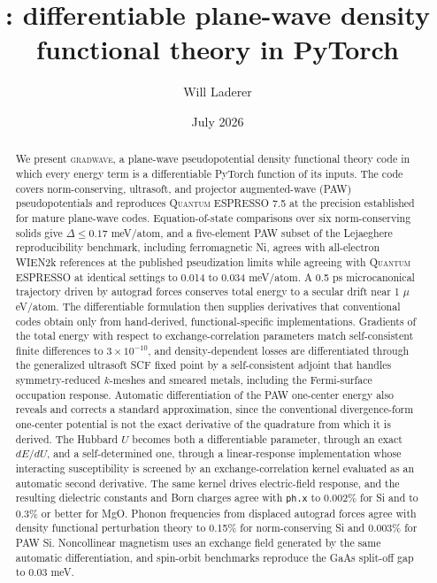 \documentclass[11pt,twocolumn]{article}
\title{\gw: differentiable plane-wave density functional theory in PyTorch}
\author{Will Laderer}
\date{July 2026}
\newcommand{\gw}{\textsc{gradwave}}
\newcommand{\qe}{\textsc{Quantum ESPRESSO}}
\begin{document}
\maketitle

\begin{abstract}
We present \gw, a plane-wave pseudopotential density functional theory code
in which every energy term is a differentiable PyTorch function of its
inputs. The code covers norm-conserving, ultrasoft, and projector
augmented-wave (PAW) pseudopotentials and reproduces \qe{} 7.5 at the
precision established for mature plane-wave codes. Equation-of-state
comparisons over six norm-conserving solids give $\Delta \leq 0.17$
meV/atom, and a five-element PAW subset of the Lejaeghere reproducibility
benchmark, including ferromagnetic Ni, agrees with all-electron WIEN2k
references at the published pseudization limits while agreeing with \qe{}
at identical settings to 0.014 to 0.034 meV/atom. A 0.5 ps microcanonical
trajectory driven by autograd forces conserves total energy to a secular
drift near 1 $\mu$eV/atom. The differentiable formulation then supplies
derivatives that conventional codes obtain only from hand-derived,
functional-specific implementations. Gradients of the total energy with
respect to exchange-correlation parameters match self-consistent finite
differences to $3\times10^{-10}$, and density-dependent losses are
differentiated through the generalized ultrasoft SCF fixed point by a
self-consistent adjoint that handles symmetry-reduced $k$-meshes and
smeared metals, including the Fermi-surface occupation response. Automatic
differentiation of the PAW one-center energy also reveals and corrects a
standard approximation, since the conventional divergence-form one-center
potential is not the exact derivative of the quadrature from which it is
derived.
The Hubbard $U$ becomes both a differentiable parameter, through an exact
$dE/dU$, and a self-determined one, through a linear-response implementation
whose interacting susceptibility is screened by an exchange-correlation
kernel evaluated as an automatic second derivative. The same kernel drives
electric-field response, and the resulting dielectric constants and Born
charges agree with \texttt{ph.x} to 0.002\% for Si and to 0.3\% or better
for MgO. Phonon frequencies from displaced autograd forces agree with
density functional perturbation theory to 0.15\% for norm-conserving Si and
0.003\% for PAW Si. Noncollinear magnetism uses an exchange field generated
by the same automatic differentiation, and spin-orbit benchmarks reproduce
the GaAs split-off gap to 0.03 meV.
\end{abstract}
\end{document}
